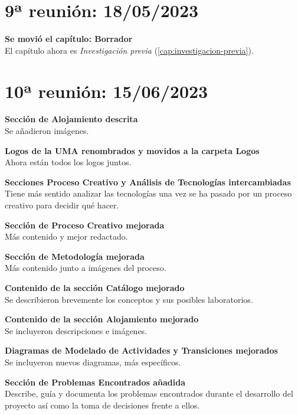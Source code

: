         \newpage

    \section{9ª reunión: 18/05/2023}

        \textbf{Se movió el capítulo: Borrador} \\
        El capítulo ahora es \textit{Investigación previa} (\ref{cap:investigacion-previa}).

        \newpage


    \section{10ª reunión: 15/06/2023}

        \textbf{Sección de Alojamiento descrita} \\
        Se añadieron imágenes.

        \textbf{Logos de la UMA renombrados y movidos a la carpeta Logos} \\
        Ahora están todos los logos juntos.

        \textbf{Secciones Proceso Creativo y Análisis de Tecnologías intercambiadas} \\
        Tiene más sentido analizar las tecnologías una vez se ha pasado por un proceso creativo para decidir qué hacer.

        \textbf{Sección de Proceso Creativo mejorada} \\
        Más contenido y mejor redactado.

        \textbf{Sección de Metodología mejorada} \\
        Más contenido junto a imágenes del proceso.

        \textbf{Contenido de la sección Catálogo mejorado} \\
        Se describieron brevemente los conceptos y sus posibles laboratorios.

        \textbf{Contenido de la sección Alojamiento mejorado} \\
        Se incluyeron descripciones e imágenes.

        \textbf{Diagramas de Modelado de Actividades y Transiciones mejorados} \\
        Se incluyeron nuevos diagramas, más específicos.

        \textbf{Sección de Problemas Encontrados añadida} \\
        Describe, guía y documenta los problemas encontrados durante el desarrollo del proyecto así como la toma de decisiones frente a ellos.

